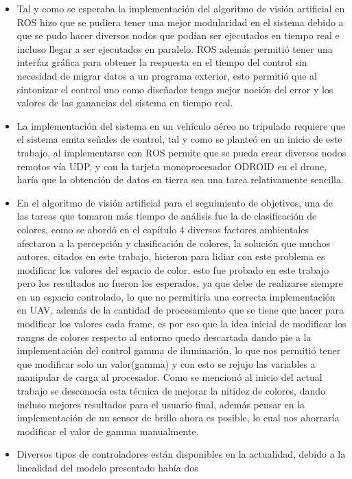 \begin{itemize}
    \item Tal y como se esperaba la implementación del algoritmo de visión artificial en ROS hizo que se pudiera tener una mejor modularidad
    en el sistema debido a que se pudo hacer diversos nodos que podían ser ejecutados en tiempo real e incluso llegar a ser
    ejecutados en paralelo. ROS además permitió tener una interfaz gráfica para obtener la respuesta en el tiempo del control sin necesidad
    de migrar datos a un programa exterior, esto permitió que al sintonizar el control uno como diseñador tenga
    mejor noción del error y los valores de las ganancias del sistema en tiempo real.
    \item La implementación del sistema en un vehículo aéreo no tripulado requiere que el sistema emita señales de control, tal y como
    se planteó en un inicio de este trabajo, al implementarse con ROS permite que se pueda crear diversos nodos remotos vía UDP, y con
    la tarjeta monoprocesador ODROID en el drone, haría que la obtención de datos en tierra sea una tarea relativamente sencilla.
    \item En el algoritmo de visión artificial para el seguimiento de objetivos, una de las tareas que tomaron más tiempo de análisis
    fue la de clasificación de colores, como se abordó en el capítulo 4 diversos factores ambientales afectaron a la percepción y
    clasificación de colores, la solución que muchos autores, citados en este trabajo, hicieron para lidiar con este problema es modificar
    los valores del espacio de color, esto fue probado en este trabajo pero los resultados no fueron los esperados, ya que debe de realizarse
    siempre en un espacio controlado, lo que no permitiría una correcta implementación en UAV, además de la cantidad de procesamiento
    que se tiene que hacer para modificar los valores cada frame, es por eso que la idea inicial de modificar los rangos de colores respecto
    al entorno quedo descartada dando pie a la implementación del control gamma de iluminación, lo que nos permitió tener que modificar
    solo un valor(gamma) y con esto se rejujo las variables a manipular de carga al procesador. Como se mencionó al inicio del actual trabajo se desconocía
    esta técnica de mejorar la nitidez de colores, dando incluso mejores resultados para el usuario final, además pensar en la implementación
    de un sensor de brillo ahora es posible, lo cual nos ahorraría modificar el valor de gamma manualmente.
    \item Diversos tipos de controladores están disponibles en la actualidad, debido a la linealidad del modelo presentado había dos

\end{itemize}
